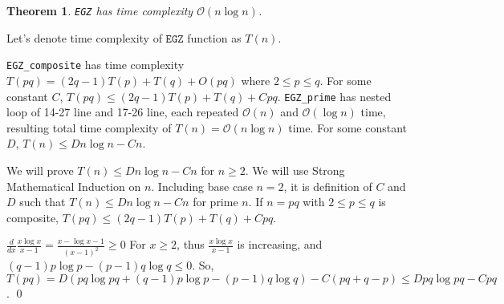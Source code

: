 \documentclass[11pt]{article}
\newtheorem{theorem}{Theorem}
\begin{document}
\begin{theorem}

\texttt{EGZ} has time complexity $\mathcal{O}(n \log n)$.

\end{theorem}

Let's denote time complexity of $\texttt{EGZ}$ function as $T(n)$.

\texttt{EGZ\_composite} has time complexity $T(pq) = (2q-1)T(p) + T(q) + O(pq)$ where $2 \le p \le q$. For some constant $C$, $T(pq) \le (2q-1)T(p) + T(q) + Cpq$. \texttt{EGZ\_prime} has nested loop of 14-27 line and 17-26 line, each repeated $\mathcal{O}(n)$ and $\mathcal{O}(\log n)$ time, resulting total time complexity of $T(n) = \mathcal{O}(n \log n)$ time. For some constant $D$, $T(n) \le D n \log n - C n$.

We will prove $T(n) \le D n \log n - C n$ for $n \ge 2$. We will use Strong Mathematical Induction on $n$. Including base case $n = 2$, it is definition of $C$ and $D$ such that $T(n) \le D n \log n - C n$ for prime $n$. If $n = pq$ with $2 \le p \le q$ is composite, $T(pq) \le (2q-1)T(p) + T(q) + Cpq$.

$\frac{d}{dx} \frac{x \log x}{x-1} = \frac{x - \log x - 1}{(x-1)^2} \ge 0$ For $x \ge 2$, thus $\frac{x \log x}{x-1}$ is increasing, and $(q-1) p \log p - (p-1) q \log q \le 0$. So, $T(pq) = D ( pq \log pq + (q-1) p \log p - (p-1) q \log q) - C (pq + q - p) \le D pq \log pq - C pq$. \qed 








\end{document}
